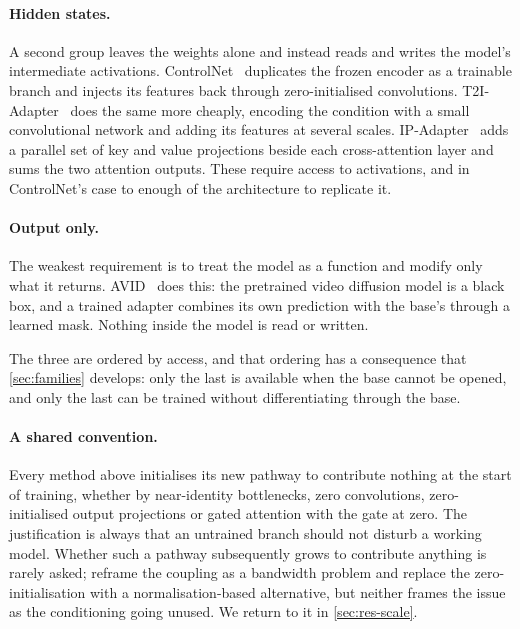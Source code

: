 \paragraph{Hidden states.} A second group leaves the weights alone and
instead reads and writes the model's intermediate activations.
ControlNet~\citep{zhang2023controlnet} duplicates the frozen encoder as a
trainable branch and injects its features back through zero-initialised
convolutions. T2I-Adapter~\citep{mou2024t2iadapter} does the same more
cheaply, encoding the condition with a small convolutional network and
adding its features at several scales. IP-Adapter~\citep{ye2023ipadapter}
adds a parallel set of key and value projections beside each cross-attention
layer and sums the two attention outputs. These require access to
activations, and in ControlNet's case to enough of the architecture to
replicate it.

\paragraph{Output only.} The weakest requirement is to treat the model as a
function and modify only what it returns. AVID~\citep{rigter2024avid} does
this: the pretrained video diffusion model is a black box, and a trained
adapter combines its own prediction with the base's through a learned mask.
Nothing inside the model is read or written.

\medskip

The three are ordered by access, and that ordering has a consequence that
\cref{sec:families} develops: only the last is available when the base
cannot be opened, and only the last can be trained without differentiating
through the base.

\paragraph{A shared convention.} Every method above initialises its new
pathway to contribute nothing at the start of training, whether by
near-identity bottlenecks, zero convolutions, zero-initialised output
projections or gated attention with the gate at zero. The justification is
always that an untrained branch should not disturb a working model. Whether
such a pathway subsequently grows to contribute anything is rarely asked;
\citet{zavadski2024controlnetxs} reframe the coupling as a bandwidth
problem and \citet{peng2024controlnext} replace the zero-initialisation with
a normalisation-based alternative, but neither frames the issue as the
conditioning going unused. We return to it in \cref{sec:res-scale}.

